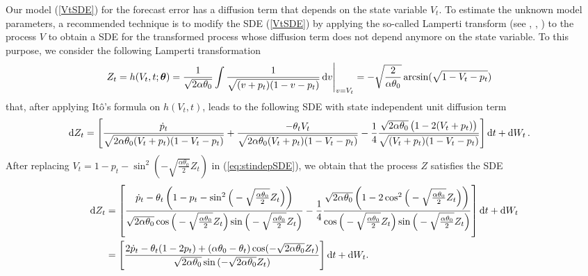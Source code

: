 \documentclass[11pt]{article}
\theoremstyle{definition}
\begin{document}
Our model (\ref{VtSDE}) for the forecast error has a diffusion term that depends on the state variable $V_t$. To estimate the unknown model parameters, a recommended technique is to modify the SDE (\ref{VtSDE}) by applying the so-called Lamperti transform (see \cite[40--41]{iacus1}, \cite{moma}, \cite[98--100]{saso}) to the process $V$ to obtain a SDE for the transformed process whose diffusion term does not depend anymore on the state variable. To this purpose, we consider the following Lamperti transformation  
\begin{align}
Z_t = h(V_t, t; \bm{\theta} )  & = \frac{1}{\sqrt{2 \alpha \theta_0 }} \int \frac{1}{\sqrt{(v + p_t)(1 - v - p_t)}} \dif v \Bigg{\vert}_{v = V_t}   = - \sqrt{ \frac{2}{ \alpha \theta_0 }} \arcsin (\sqrt{ 1 - V_t - p_t}) \label{eq:LampZ}
\end{align}
that, after applying It\^{o}'s formula on $h(V_t, t)$, leads to the following SDE with state independent unit diffusion term
\begin{align}
\dif Z_t = \Bigg[  & \frac{\dot{p}_t}{ \sqrt{2 \alpha \theta_0 (V_t + p_t)(1 - V_t - p_t)}}  + \frac{- \theta_t V_t}{ \sqrt{2  \alpha \theta_0 (V_t + p_t)(1 - V_t - p_t)}} - \frac{1}{4} \frac{\sqrt{2 \alpha \theta_0} \left( 1 - 2 (V_t + p_t)\right)}{\sqrt{(V_t + p_t)(1 - V_t - p_t)}}  \Bigg] \dif t + \dif W_t \,. \label{eq:stindepSDE}
\end{align}
After replacing $V_t = 1 - p_t - \sin^2 \left(- \sqrt{ \frac{ \alpha \theta_0}{2} } Z_t \right) $ in (\ref{eq:stindepSDE}), we obtain that the  process $Z$ satisfies the SDE
\begin{align}
\dif Z_t & = \left[ \frac{ \dot{p}_t  - \theta_t  \left(1 - p_t - \sin^2 \Big(- \sqrt{ \frac{ \alpha \theta_0}{2} } Z_t \Big) \right) }{\sqrt{2 \alpha \theta_0} \cos\Big(- \sqrt{ \frac{ \alpha \theta_0}{2} } Z_t \Big)  \sin\Big(- \sqrt{ \frac{ \alpha \theta_0}{2} } Z_t \Big)}   - \frac{1}{4}  \frac{\sqrt{2 \alpha \theta_0} \left(1 - 2 \cos^2 \Big(- \sqrt{ \frac{ \alpha \theta_0}{2} } Z_t \Big) \right) }{\cos\Big(- \sqrt{ \frac{ \alpha \theta_0}{2} } Z_t \Big)  \sin\Big(- \sqrt{ \frac{ \alpha \theta_0}{2} } Z_t \Big)} \right]\dif t + \dif W_t \nonumber \\
&  = \left[  \frac{  2  \dot{p}_t - \theta_t (1 - 2 p_t)  + (\alpha \theta_0 - \theta_t) \cos(- \sqrt{2 \alpha \theta_0 } Z_t) }{\sqrt{2 \alpha \theta_0} \sin{(- \sqrt{2 \alpha \theta_0} Z_t)}}  \right] \dif t + \dif W_t.  \label{eq:stindepSDE2}
\end{align}
\end{document}
